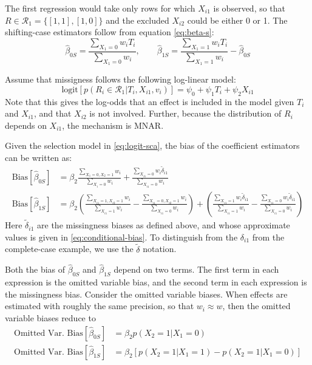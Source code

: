 \documentclass[
]{article}
\begin{document}
The first regression would take only rows for which \(X_{i1}\) is observed, so that \(R \in \mathcal{R}_{1} = \{[1,1], [1,0]\}\) and the excluded \(X_{i2}\) could be either 0 or 1.
The shifting-case estimators follow from equation \eqref{eq:beta-s}:
\[
\hat{\beta}_{0S} = \frac{\sum_{X_1 = 0} w_i T_i}{\sum_{X_1 = 0} w_i}, 
\qquad \hat{\beta}_{1S} = \frac{\sum_{X_1 = 1} w_i T_i}{\sum_{X_1 = 1} w_i} - \hat{\beta}_{0S}
\]

Assume that missigness follows the following log-linear model:
\begin{equation}
\text{logit}[p(R_i \in \mathcal{R}_{1} | T_i, X_{i1}, v_i)] = \psi_{0} + \psi_{1} T_i + \psi_{2} X_{i1} 
\label{eq:logit-sca}
\end{equation}
Note that this gives the log-odds that an effect is included in the model given \(T_i\) and \(X_{i1}\), and that \(X_{i2}\) is not involved.
Further, because the distribution of \(R_i\) depends on \(X_{i1}\), the mechanism is MNAR.

Given the selection model in \eqref{eq:logit-sca}, the bias of the coefficient estimators can be written as:
\begin{align}
\text{Bias}[\hat{\beta}_{0S}]
  & = \beta_2 \frac{\sum_{X_1 = 0, X_2 = 1} w_i}{\sum_{X_i = 0} w_i} + \frac{\sum_{X_{i1} = 0} w_i \tilde{\delta}_{i1}}{\sum_{X_{i1} = 0} w_i}  \\
\text{Bias}[\hat{\beta}_{1S}]
  & = \beta_2 \left(\frac{\sum_{X_{i1} = 1, X_{i2} = 1} w_i}{\sum_{X_{i1} = 1} w_i} - \frac{\sum_{X_{i1} = 0, X_{i2} = 1} w_i}{\sum_{X_{i1} = 0} w_i}\right) + \left(\frac{\sum_{X_{i1} = 1} w_i \tilde{\delta}_{i1}}{\sum_{X_{i1} = 1} w_i} - \frac{\sum_{X_{i1} = 0} w_i \tilde{\delta}_{i1}}{\sum_{X_{i1} = 0} w_i}\right)
\end{align}
Here \(\tilde{\delta}_{i1}\) are the missingness biases as defined above, and whose approximate values is given in \eqref{eq:conditional-bias}.
To distinguish from the \(\delta_{i1}\) from the complete-case example, we use the \(\tilde{\delta}\) notation.

Both the bias of \(\hat{\beta}_{0S}\) and \(\hat{\beta}_{1S}\) depend on two terms.
The first term in each expression is the omitted variable bias, and the second term in each expression is the missingness bias.
Consider the omitted variable biases.
When effects are estimated with roughly the same precision, so that \(w_i \approx w\), then the omitted variable biases reduce to
\begin{align}
\text{Omitted Var. Bias}[\hat{\beta}_{0S}]
  & = \beta_2 p(X_2 = 1 | X_1 = 0) \label{eq:omvar-b0}\\
\text{Omitted Var. Bias}[\hat{\beta}_{1S}]
  & = \beta_2 \left[p(X_2 = 1 | X_1 = 1) - p(X_2 = 1 | X_1 = 0) \right] \label{eq:omvar-b1}
\end{align}
\end{document}
